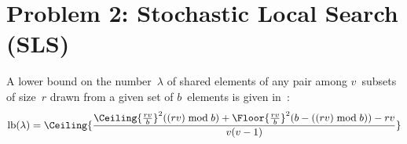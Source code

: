 \section*{Problem 2: Stochastic Local Search (SLS)}

%  
%
%  
  A lower bound on the number~$\lambda$ of shared elements of any
  pair among $v$~subsets of size~$r$ drawn from a given set of
  $b$~elements is given in~\cite{ASTRA:AOC}:
  \begin{equation}\label{eq:lb}
  \text{lb}(\lambda) = 
    \Ceiling{
      \frac{\Ceiling{\frac{rv}{b}}^{2} ((rv) \bmod b)  +
        \Floor{\frac{rv}{b}}^{2} (b - ((rv) \bmod b)) - rv}
      {v(v-1)}
    }
  \end{equation}
%  

